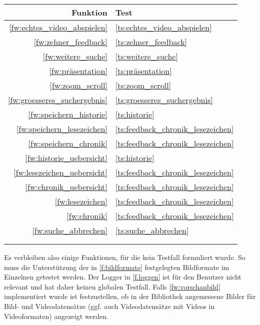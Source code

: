 \begin{minipage}[t]{0.28\textwidth}
\begin{tabular}{r | l}
Funktion & Test \\
\hline
\ref{fw:echtes_video_abspielen} & \ref{ts:echtes_video_abspielen} \\
\ref{fw:zehner_feedback} & \ref{ts:zehner_feedback} \\
\ref{fw:weitere_suche} & \ref{ts:weitere_suche} \\
\ref{fw:präsentation} & \ref{ts:präsentation} \\
\ref{fw:zoom_scroll} & \ref{ts:zoom_scroll} \\
\ref{fw:groesseres_suchergebnis} & \ref{ts:groesseres_suchergebnis} \\
\ref{fw:speichern_historie} & \ref{ts:historie} \\
\ref{fw:speichern_lesezeichen} & \ref{ts:feedback_chronik_lesezeichen} \\
\ref{fw:speichern_chronik} & \ref{ts:feedback_chronik_lesezeichen} \\
\ref{fw:historie_uebersicht} & \ref{ts:historie} \\
\ref{fw:lesezeichen_uebersicht} & \ref{ts:feedback_chronik_lesezeichen} \\
\ref{fw:chronik_uebersicht} & \ref{ts:feedback_chronik_lesezeichen} \\
\ref{fw:lesezeichen} & \ref{ts:feedback_chronik_lesezeichen} \\
\ref{fw:chronik} & \ref{ts:feedback_chronik_lesezeichen} \\
\ref{fw:suche_abbrechen} & \ref{ts:suche_abbrechen} \\
 &  \\
 &  \\
\end{tabular}
\end{minipage}
\label{tab:testueberdeckung}
Es verbleiben also einige Funktionen, für die kein Testfall formuliert wurde.
So muss die Unterstützung der in \ref{f:bildformate} festgelegten Bildformate im Einzelnen getestet werden.
Der Logger in \ref{f:loggen} ist für den Benutzer nicht relevant  und hat daher keinen globalen Testfall.
Falls \ref{fw:vorschaubild} implementiert wurde ist festzustellen, ob in der Bibliothek angemessene Bilder für Bild- und Videodatensätze (ggf. auch Videodatensätze mit Videos in Videoformaten) angezeigt werden.

\pagebreak
